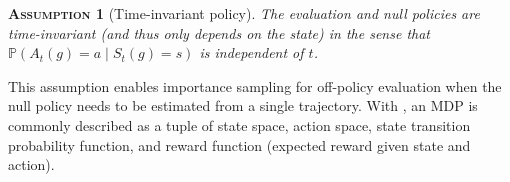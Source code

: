 \documentclass[12pt,a4paper]{article}
\newtheorem{assumption}{\normalfont\scshape Assumption}
\theoremstyle{definition}
\newcommand{\PP}[0]{\mathbb{P}}
\begin{document}
\begin{assumption}[Time-invariant policy] \label{assump:policy_time_invariance}
  The evaluation and null policies are time-invariant (and thus only depends
  on the state) in the sense that
  $\PP(A_t(g) = a \mid S_t(g) = s)$ is independent of $t$.
\end{assumption}

This assumption enables importance sampling for
off-policy evaluation when the null policy needs to be estimated from
a single trajectory. With
, an
MDP is commonly described as a tuple of state space, action space, state
transition probability function, and reward function (expected reward
given state and action).



\end{document}
